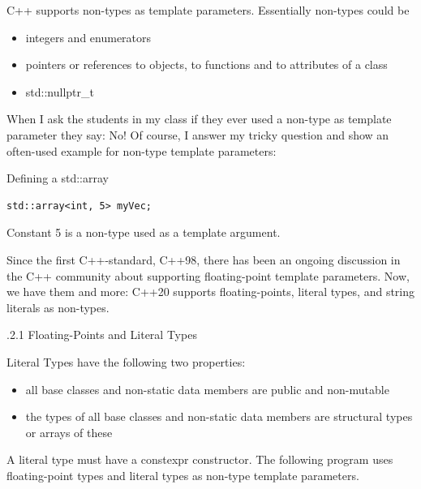 C++ supports non-types as template parameters. Essentially non-types could be

\begin{itemize}
\item 
integers and enumerators

\item 
pointers or references to objects, to functions and to attributes of a class

\item 
std::nullptr\_t
\end{itemize}

\begin{tcolorbox}[colback=mygreen!5!white,colframe=mygreen!75!black,title={Typical Non-Type Template Parameter}]
When I ask the students in my class if they ever used a non-type as template parameter they say: No! Of course, I answer my tricky question and show an often-used example for non-type template parameters:

\noindent
Defining a std::array
\begin{lstlisting}[style=styleCXX]
std::array<int, 5> myVec;
\end{lstlisting}

Constant 5 is a non-type used as a template argument.
\end{tcolorbox}	

Since the first C++-standard, C++98, there has been an ongoing discussion in the C++ community about supporting floating-point template parameters. Now, we have them and more: C++20 supports floating-points, literal types, and string literals as non-types.

.2.1\hspace{0.2cm} Floating-Points and Literal Types

Literal Types have the following two properties:

\begin{itemize}
\item 
all base classes and non-static data members are public and non-mutable

\item 
the types of all base classes and non-static data members are structural types or arrays of these
\end{itemize}

A literal type must have a constexpr constructor. The following program uses floating-point types and literal types as non-type template parameters.

